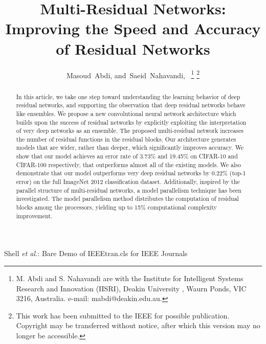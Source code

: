 \documentclass[journal]{IEEEtran}
\begin{document}
\title{Multi-Residual Networks: Improving the Speed and Accuracy of Residual Networks}

\author{Masoud~Abdi,
        and~Saeid~Nahavandi,~%
\thanks{M. Abdi and S. Nahavandi are with the Institute for Intelligent Systems Research and Innovation (IISRI), Deakin University , Waurn Ponds,
VIC 3216, Australia. e-mail: mabdi@deakin.edu.au.
}
\thanks{This work has been submitted to the IEEE for possible publication. Copyright may be transferred without notice, after which this version may no longer be accessible.}%
}




%
{Shell \MakeLowercase{\textit{et al.}}: Bare Demo of IEEEtran.cls for IEEE Journals}











\maketitle

\begin{abstract}
In this article, we take one step toward understanding the learning behavior of deep residual networks, and supporting the observation that deep residual networks behave like ensembles. We propose a new convolutional neural network architecture which builds upon the success of residual networks by explicitly exploiting the interpretation of very deep networks as an ensemble. The proposed multi-residual network increases the number of residual functions in the residual blocks. Our architecture generates models that are wider, rather than deeper, which significantly improves accuracy.  We show that our model achieves an error rate of 3.73\% and 19.45\% on CIFAR-10 and CIFAR-100 respectively, that outperforms almost all of the existing models. We also demonstrate that our model outperforms very deep residual networks by 0.22\% (top-1 error) on the full ImageNet 2012 classification dataset.  Additionally, inspired by the parallel structure of multi-residual networks, a model parallelism technique has been investigated. The model parallelism method distributes the computation of residual blocks among the processors, yielding up to 15\% computational complexity improvement.  %
\end{abstract}
\end{document}
